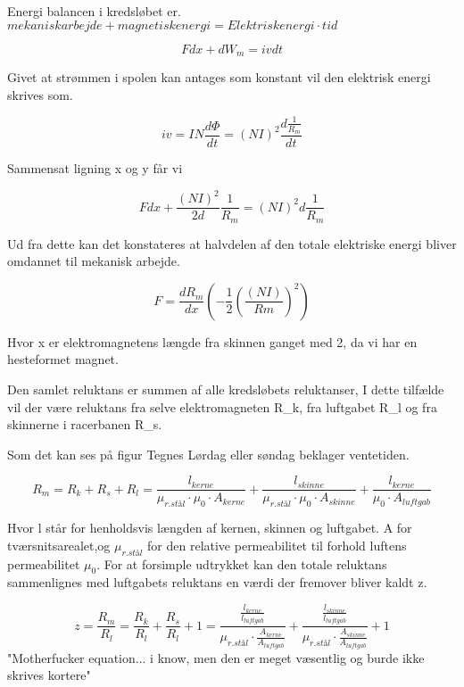 Energi balancen i kredsløbet er.
$mekanisk arbejde + magnetisk energi =Elektrisk energi \cdot tid$

\begin{equation}
F dx + dW_m = iv dt
\end{equation}

Givet at strømmen i spolen kan antages som konstant vil den elektrisk energi skrives som.

\begin{equation}
iv=IN \frac{d\Phi}{dt} =(NI)^2  \frac{d\frac{1}{R_m}}{dt}
\end{equation}
  

Sammensat ligning x og y får vi

\begin{equation}
F dx+\frac{(NI)^2}{2d} \frac{1}{R_m} =(NI)^2  d \frac{1}{R_m}
\end{equation}

Ud fra dette kan det konstateres at halvdelen af den totale elektriske energi bliver omdannet til mekanisk arbejde.

\begin{equation}
F = \frac{dR_m}{dx} (-\frac{1}{2} (\frac{(NI)}{Rm} )^2 )
\end{equation}

Hvor x er elektromagnetens længde fra skinnen ganget med 2, da vi har en hesteformet magnet.

Den samlet reluktans er summen af alle kredsløbets reluktanser, I dette tilfælde vil der være reluktans fra selve elektromagneten R_k, fra luftgabet R_l og fra skinnerne i racerbanen R_s. 

Som det kan ses på figur Tegnes Lørdag eller søndag beklager ventetiden.

\begin{equation}
R_m =R_k + R_s + R_l = \frac{l_{kerne}}{\mu_{r.stål} \cdot \mu_0 \cdot A_{kerne} } + \frac{l_{skinne}}{\mu_{r.stål} \cdot \mu_0 \cdot A_{skinne} }  + \frac{l_{kerne}}{\mu_0 \cdot A_{luftgab} } 
\end{equation}

Hvor l står for henholdsvis længden af kernen, skinnen og luftgabet. A for tværsnitsarealet,og $ \mu_{r.stål} $ for den relative permeabilitet til forhold luftens permeabilitet $\mu_0$.  For at forsimple udtrykket kan den totale reluktans sammenlignes med luftgabets reluktans en værdi  der fremover bliver kaldt z.

\begin{equation}
z = \frac{R_m}{R_l} = \frac{R_k}{R_l} +\frac{R_s}{R_l} + 1 = 

\frac{	
	\frac{l_{kerne}}{l_{luftgab}} }
	{\mu_{r.stål} \cdot \frac{A_{kerne}}{A_{luftgab}} } 
+
\frac{	
	\frac{l_{skinne}}{l_{luftgab}} }
{\mu_{r.stål} \cdot \frac{A_{skinne}}{A_{luftgab}} } 
+ 1
\end{equation}
"Motherfucker equation... i know, men den er meget væsentlig og burde ikke skrives kortere"

